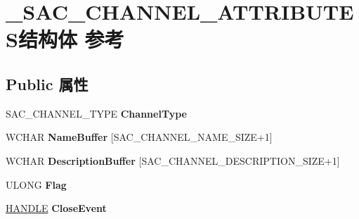 \hypertarget{struct___s_a_c___c_h_a_n_n_e_l___a_t_t_r_i_b_u_t_e_s}{}\section{\+\_\+\+S\+A\+C\+\_\+\+C\+H\+A\+N\+N\+E\+L\+\_\+\+A\+T\+T\+R\+I\+B\+U\+T\+E\+S结构体 参考}
\label{struct___s_a_c___c_h_a_n_n_e_l___a_t_t_r_i_b_u_t_e_s}
\subsection*{Public 属性}
\begin{DoxyCompactItemize}
\item 
\mbox{\label{struct___s_a_c___c_h_a_n_n_e_l___a_t_t_r_i_b_u_t_e_s_a25a95af324ebef56e247669128f2b2a7}} 
S\+A\+C\+\_\+\+C\+H\+A\+N\+N\+E\+L\+\_\+\+T\+Y\+PE {\bfseries Channel\+Type}
\item 
\mbox{\label{struct___s_a_c___c_h_a_n_n_e_l___a_t_t_r_i_b_u_t_e_s_a88d5b812044113a765c1b63d8619bfb5}} 
W\+C\+H\+AR {\bfseries Name\+Buffer} \mbox{[}S\+A\+C\+\_\+\+C\+H\+A\+N\+N\+E\+L\+\_\+\+N\+A\+M\+E\+\_\+\+S\+I\+ZE+1\mbox{]}
\item 
\mbox{\label{struct___s_a_c___c_h_a_n_n_e_l___a_t_t_r_i_b_u_t_e_s_a2a8b7c19475eb9b642a8707af84845bb}} 
W\+C\+H\+AR {\bfseries Description\+Buffer} \mbox{[}S\+A\+C\+\_\+\+C\+H\+A\+N\+N\+E\+L\+\_\+\+D\+E\+S\+C\+R\+I\+P\+T\+I\+O\+N\+\_\+\+S\+I\+ZE+1\mbox{]}
\item 
\mbox{\label{struct___s_a_c___c_h_a_n_n_e_l___a_t_t_r_i_b_u_t_e_s_ac31d8943fb315078491e72399dcd834d}} 
U\+L\+O\+NG {\bfseries Flag}
\item 
\mbox{\label{struct___s_a_c___c_h_a_n_n_e_l___a_t_t_r_i_b_u_t_e_s_afc66fc632963b35777c49fccd7c8bc2c}} 
\hyperlink{interfacevoid}{H\+A\+N\+D\+LE} {\bfseries Close\+Event}
\item 
\mbox{\label{struct___s_a_c___c_h_a_n_n_e_l___a_t_t_r_i_b_u_t_e_s_a8857199e7e407987f9f30353805f4c9b}} 

\end{DoxyCompactItemize}

